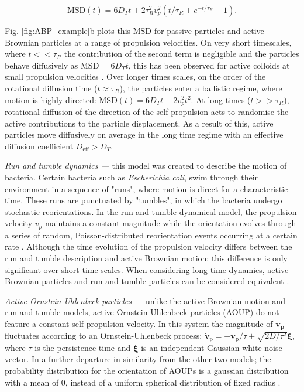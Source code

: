 \begin{equation}
	\textrm{MSD} (t) = 6 D_{T} t+2 \tau_{R}^{2} v_{p}^{2}\left(t/\tau_{R}+e^{-t /\tau_{R}}-1\right).
	\label{eq:MSD_3D}
\end{equation}


\noindent Fig. \ref{fig:ABP_example}b plots this MSD for passive particles and active Brownian particles at a range of propulsion velocities. On very short timescales, where $t << \tau_R$ the contribution of the second term is negligible and the particles behave diffusively as MSD = $6D_T t$, this has been observed for active colloids at small propulsion velocities \cite{zheng2013a}. Over longer times scales, on the order of the rotational diffusion time ($t \approx \tau_R$), the particles enter a ballistic regime, where motion is highly directed: $\textrm{MSD}(t) = 6D_T t + 2v^{2}_{p}t^2$. At long times ($t >> \tau_R$), rotational diffusion of the direction of the self-propulsion acts to randomise the active contributions to the particle displacement. As a result of this, active particles move diffusively on average in the long time regime with an effective diffusion coefficient $D_\textrm{eff} > D_T$.




\textit{Run and tumble dynamics ---} this model was created to describe the motion of bacteria. Certain bacteria such as \textit{Escherichia coli}, swim through their environment in a sequence of "runs", where motion is direct for a characteristic time. These runs are punctuated by "tumbles", in which the bacteria undergo stochastic reorientations. In the run and tumble dynamical model, the propulsion velocity $v_p$ maintains a constant magnitude while the orientation evolves through a series of random, Poisson-distributed reorientation events occurring at a certain rate \cite{tailleur2008}. Although the time evolution of the propulsion velocity differs between the run and tumble description and active Brownian motion; this difference is only significant over short time-scales. When considering long-time dynamics, active Brownian particles and run and tumble particles can be considered equivalent \cite{cates2013}.

\textit{Active Ornstein-Uhlenbeck particles ---} unlike the active Brownian motion and run and tumble models, active Ornstein-Uhlenbeck particles (AOUP) do not feature a constant self-propulsion velocity. In this system the magnitude of $\mathbf{v_p}$ fluctuates according to an Ornstein-Uhlenbeck process: $\dot{\mathbf{v}}_{\mathrm{p}}=-\mathbf{v}_{\mathrm{p}} / \tau+\sqrt{2 D / \tau^{2}} \boldsymbol{\xi}$, where $\tau$ is the persistence time and $\boldsymbol{\xi}$ is an independent Gaussian white noise vector. In a further departure in similarity from the other two models; the probability distribution for the orientation of AOUPs is a gaussian distribution with a mean of 0, instead of a uniform spherical distribution of fixed radius \cite{bonilla2019}.


